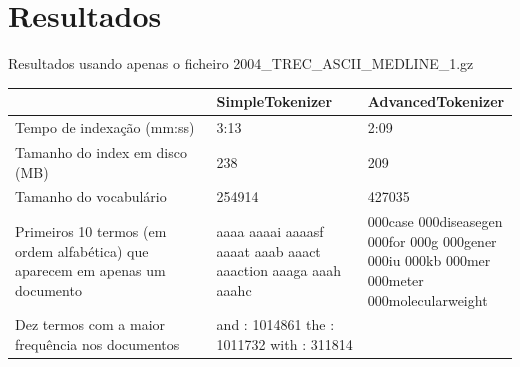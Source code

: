 \documentclass[12pt]{article}
\begin{document}
\newpage

\section{Resultados}

Resultados usando apenas o ficheiro 2004\_TREC\_ASCII\_MEDLINE\_1.gz \\

\begin{tabular}{| p{0.4\linewidth} | p{0.3\linewidth} | p{0.3\linewidth} |}
        \hline
        & \bf SimpleTokenizer & \bf AdvancedTokenizer \\ \hline
        Tempo de indexação (mm:ss) & 3:13 & 2:09 \\ \hline
        Tamanho do index em disco (MB) & 238 & 209 \\ \hline
        Tamanho do vocabulário & 254914 & 427035\\ \hline
        Primeiros 10 termos (em ordem
        alfabética) que aparecem em
        apenas um documento
        &
        aaaa \newline
        aaaai \newline
        aaaasf \newline
        aaaat \newline
        aaab \newline
        aaact \newline
        aaaction \newline
        aaaga \newline
        aaah \newline
        aaahc
        &
        000case \newline
        000diseasegen \newline
        000for \newline
        000g \newline
        000gener \newline
        000iu \newline
        000kb \newline
        000mer \newline
        000meter \newline
        000molecularweight
        \\ \hline
        Dez termos com a maior frequência nos documentos
        &
       and : 1014861 \newline
       the : 1011732 \newline
      with : 311814 \newline

\end{tabular}
\end{document}
